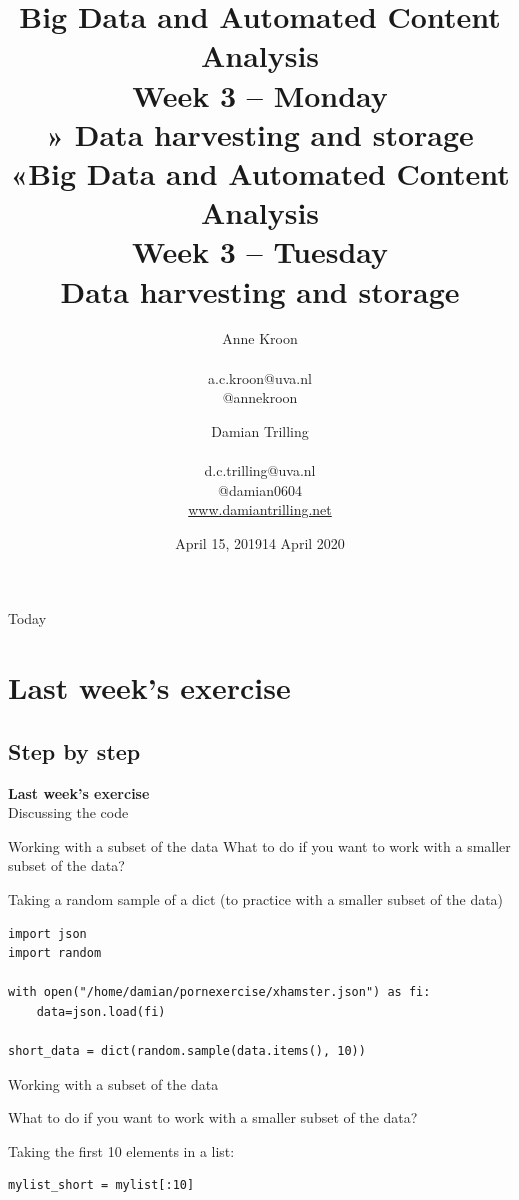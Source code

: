 \documentclass{beamer}
\title[Big Data and Automated Content Analysis]{\textbf{Big Data and Automated Content Analysis} \\ Week 3 -- Monday \\ » Data harvesting and storage «}
\author[Anne Kroon]{Anne Kroon \\ ~ \\ \footnotesize{a.c.kroon@uva.nl \\@annekroon} \\}
\date{April 15, 2019}
\title[Big Data and Automated Content Analysis]{\textbf{Big Data and Automated Content Analysis} \\ Week 3 -- Tuesday \\ Data harvesting and storage}
\author[Damian Trilling]{Damian Trilling \\ ~ \\ \footnotesize{d.c.trilling@uva.nl \\@damian0604} \\ \url{www.damiantrilling.net}}
\date{14 April 2020}
\institute[UvA]{Afdeling Communicatiewetenschap \\Universiteit van Amsterdam}
\begin{document}
\begin{frame}{}
\titlepage
\end{frame}

\begin{frame}{Today}
\tableofcontents
\end{frame}




\iffalse


\section{Last week's exercise}
\subsection{Step by step}
\begin{frame}[plain]
\textbf{Last week's exercise}\\
\vspace{1cm}
Discussing the code
\end{frame}

\begin{frame}[fragile]{Working with a subset of the data}
What to do if you want to work with a smaller subset of the data?

Taking a random sample of a dict (to practice with a smaller subset of the data)
\begin{lstlisting}
import json
import random

with open("/home/damian/pornexercise/xhamster.json") as fi:
    data=json.load(fi)

short_data = dict(random.sample(data.items(), 10))

\end{lstlisting}
\end{frame}



\begin{frame}[fragile]{Working with a subset of the data}

What to do if you want to work with a smaller subset of the data?

Taking the first 10 elements in a list:
\begin{lstlisting}
mylist_short = mylist[:10]
\end{lstlisting}

\end{frame}
\end{document}
